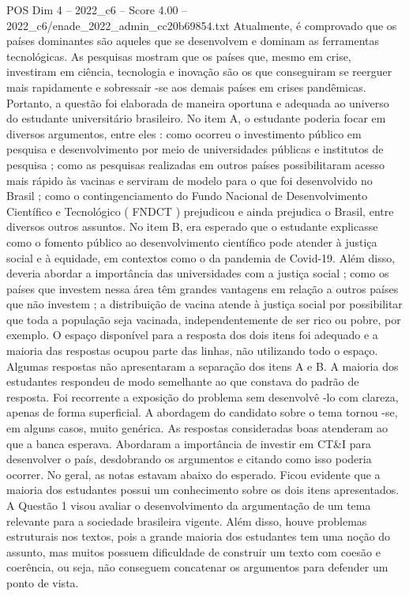 \begin{textsample}{POS Dim 4 – 2022\_c6 – Score 4.00 – 2022\_c6/enade\_2022\_admin\_cc20b69854.txt}
Atualmente, é comprovado que os países dominantes são aqueles que se desenvolvem e dominam as ferramentas tecnológicas.
As pesquisas mostram que os países que, mesmo em crise, investiram em ciência, tecnologia e inovação são os que conseguiram se reerguer mais rapidamente e sobressair -se aos demais países em crises pandêmicas.
Portanto, a questão foi elaborada de maneira oportuna e adequada ao universo do estudante universitário brasileiro.
No item A, o estudante poderia focar em diversos argumentos, entre eles : como ocorreu o investimento público em pesquisa e desenvolvimento por meio de universidades públicas e institutos de pesquisa ; como as pesquisas realizadas em outros países possibilitaram acesso mais rápido às vacinas e serviram de modelo para o que foi desenvolvido no Brasil ; como o contingenciamento do Fundo Nacional de Desenvolvimento Científico e Tecnológico ( FNDCT ) prejudicou e ainda prejudica o Brasil, entre diversos outros assuntos.
No item B, era esperado que o estudante explicasse como o fomento público ao desenvolvimento científico pode atender à justiça social e à equidade, em contextos como o da pandemia de Covid-19.
Além disso, deveria abordar a importância das universidades com a justiça social ; como os países que investem nessa área têm grandes vantagens em relação a outros países que não investem ; a distribuição de vacina atende à justiça social por possibilitar que toda a população seja vacinada, independentemente de ser rico ou pobre, por exemplo.
O espaço disponível para a resposta dos dois itens foi adequado e a maioria das respostas ocupou parte das linhas, não utilizando todo o espaço.
Algumas respostas não apresentaram a separação dos itens A e B.
A maioria dos estudantes respondeu de modo semelhante ao que constava do padrão de resposta.
Foi recorrente a exposição do problema sem desenvolvê -lo com clareza, apenas de forma superficial.
A abordagem do candidato sobre o tema tornou -se, em alguns casos, muito genérica.
As respostas consideradas boas atenderam ao que a banca esperava.
Abordaram a importância de investir em CT\&I para desenvolver o país, desdobrando os argumentos e citando como isso poderia ocorrer.
No geral, as notas estavam abaixo do esperado.
Ficou evidente que a maioria dos estudantes possui um conhecimento sobre os dois itens apresentados.
A Questão 1 visou avaliar o desenvolvimento da argumentação de um tema relevante para a sociedade brasileira vigente.
Além disso, houve problemas estruturais nos textos, pois a grande maioria dos estudantes tem uma noção do assunto, mas muitos possuem dificuldade de construir um texto com coesão e coerência, ou seja, não conseguem concatenar os argumentos para defender um ponto de vista.

\end{textsample}
